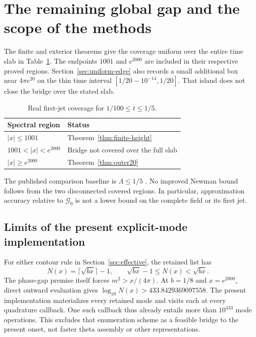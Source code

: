 \section{The remaining global gap and the scope of the methods}
\label{sec:global}

The finite and exterior theorems give the coverage uniform over the
entire time slab in Table~\ref{tab:coverage}. The endpoints $1001$ and
$e^{2000}$ are included in their respective proved regions.
Section~\ref{sec:uniform-edge} also records a small additional box near
$4\pi e^{20}$ on the thin time interval $[1/20-10^{-14},1/20]$.
That island does not close the bridge over the stated slab.
\begin{table}[htbp]
\centering
\caption{Real first-jet coverage for $1/100\le t\le1/5$.}
\label{tab:coverage}
\begin{tabular}{@{}ll@{}}
\toprule
Spectral region & Status\\
\midrule
$|x|\le1001$ & Theorem~\ref{thm:finite-height}\\
$1001<|x|<e^{2000}$ & Bridge not covered over the full slab\\
$|x|\ge e^{2000}$ & Theorem~\ref{thm:outer20}\\
\bottomrule
\end{tabular}
\end{table}

The published comparison baseline is $\Lambda\le1/5$
\cite[Corollary 2]{PlattTrudgian}. No improved Newman bound follows
from the two disconnected covered regions. In particular, approximation
accuracy relative to $\mathcal G_0$ is not a lower bound on the
complete field or its first jet.

\subsection{Limits of the present explicit-mode implementation}

For either contour rule in Section~\ref{sec:effective}, the retained
list has
\[
 N(x)=\lceil\sqrt{bx}\rceil-1,\qquad
 \sqrt{bx}-1\le N(x)<\sqrt{bx}.
\]
The phase-gap premise itself forces $m^2>x/(4\pi)$.
At $b=1/8$ and $x=e^{2000}$, direct outward evaluation gives
$\log_{10}N(x)>433.8429369097558$.
The present implementation materializes every retained mode and
visits each at every quadrature callback. One such callback thus
already entails more than $10^{433}$ mode operations.
This excludes that enumeration scheme as a feasible bridge to
the present onset, not faster theta assembly or other representations.

